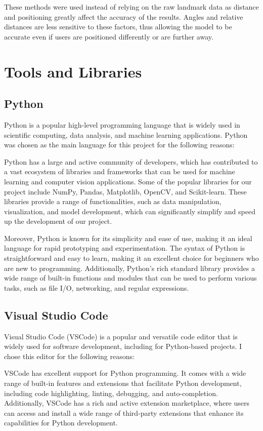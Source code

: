 \documentclass[final,rdr32.tex]{subfiles}
\begin{document}
These methods were used instead of relying on the raw landmark data as distance and positioning greatly affect the accuracy of the results. Angles and relative distances are less sensitive to these factors, thus allowing the model to be accurate even if users are positioned differently or are further away.

\section{Tools and Libraries}

\subsection*{Python}

Python is a popular high-level programming language that is widely used in scientific computing, data analysis, and machine learning applications. Python was chosen as the main language for this project for the following reasons:

Python has a large and active community of developers, which has contributed to a vast ecosystem of libraries and frameworks that can be used for machine learning and computer vision applications. Some of the popular libraries for our project include NumPy, Pandas, Matplotlib, OpenCV, and Scikit-learn. These libraries provide a range of functionalities, such as data manipulation, visualization, and model development, which can significantly simplify and speed up the development of our project.

Moreover, Python is known for its simplicity and ease of use, making it an ideal language for rapid prototyping and experimentation. The syntax of Python is straightforward and easy to learn, making it an excellent choice for beginners who are new to programming. Additionally, Python's rich standard library provides a wide range of built-in functions and modules that can be used to perform various tasks, such as file I/O, networking, and regular expressions.


\subsection{Visual Studio Code}

Visual Studio Code (VSCode) is a popular and versatile code editor that is widely used for software development, including for Python-based projects. I chose this editor for the following reasons:

VSCode has excellent support for Python programming. It comes with a wide range of built-in features and extensions that facilitate Python development, including code highlighting, linting, debugging, and auto-completion. Additionally, VSCode has a rich and active extension marketplace, where users can access and install a wide range of third-party extensions that enhance its capabilities for Python development.
\end{document}
